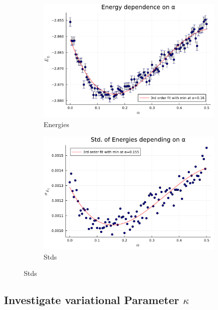 \documentclass[
	a4paper, %
	10pt, %
]{CSUniSchoolLabReport}
\begin{document}
\begin{figure}[H]
	\begin{subfigure}[b]{0.49\textwidth}
		\centering
		\includegraphics[width=\textwidth]{../saves/task1c.avEnergies.pdf}
		\caption{Energies}
	\end{subfigure}
	\hfill
	\begin{subfigure}[b]{0.49\textwidth}
		\centering
		\includegraphics[width=\textwidth]{../saves/task1c.avStd.pdf}
		\caption{Stds}
	\end{subfigure}
\end{figure}

\subsection{Investigate variational Parameter $\kappa$}
\end{document}

